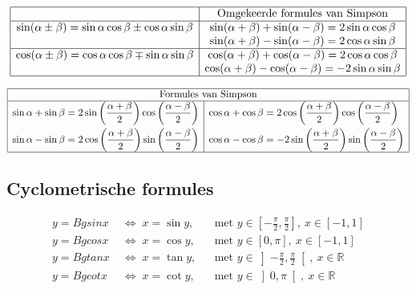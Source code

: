 \documentclass[a5paper]{article}
\begin{document}
\[
\begin{array}{|c|c|}
\hline
& \text{Omgekeerde formules van Simpson} \\ \hline

\sin(\alpha \pm \beta) = \sin\alpha\cos\beta \pm \cos\alpha\sin\beta &
\sin(\alpha + \beta) + \sin(\alpha - \beta) = 2\sin\alpha\cos\beta \\

& \sin(\alpha + \beta) - \sin(\alpha - \beta) = 2\cos\alpha\sin\beta \\ \hline

\cos(\alpha \pm \beta) = \cos\alpha\cos\beta \mp \sin\alpha\sin\beta &
\cos(\alpha + \beta) + \cos(\alpha - \beta) = 2\cos\alpha\cos\beta \\

& \cos(\alpha + \beta) - \cos(\alpha - \beta) = -2\sin\alpha\sin\beta \\ \hline

\end{array}
\]


\[
\begin{array}{|c|c|}
\hline
\multicolumn{2}{|c|}{\text{Formules van Simpson}} \\ \hline
\begin{aligned}
\sin \alpha + \sin \beta &= 2\sin\left(\frac{\alpha + \beta}{2}\right)\cos\left(\frac{\alpha - \beta}{2}\right) \\
\sin \alpha - \sin \beta &= 2\cos\left(\frac{\alpha + \beta}{2}\right)\sin\left(\frac{\alpha - \beta}{2}\right)
\end{aligned} & 
\begin{aligned}
\cos \alpha + \cos \beta &= 2\cos\left(\frac{\alpha + \beta}{2}\right)\cos\left(\frac{\alpha - \beta}{2}\right) \\
\cos \alpha - \cos \beta &= -2\sin\left(\frac{\alpha + \beta}{2}\right)\sin\left(\frac{\alpha - \beta}{2}\right)
\end{aligned} \\
\hline
\end{array}
\]
\newpage

\subsection{Cyclometrische formules}

\[
\begin{aligned}
y=Bgsin x &\;\Leftrightarrow\; x=\sin y,  && \text{met } y\in\left[-\tfrac{\pi}{2},\tfrac{\pi}{2}\right],\ x\in[-1,1]\\
y=Bgcos x &\;\Leftrightarrow\; x=\cos y,  && \text{met } y\in[0,\pi],\ x\in[-1,1]\\
y=Bgtan x &\;\Leftrightarrow\; x=\tan y,  && \text{met } y\in\left]-\tfrac{\pi}{2},\tfrac{\pi}{2}\right[,\ x\in\mathbb{R}\\
y=Bgcot x &\;\Leftrightarrow\; x=\cot y,  && \text{met } y\in\left]0,{\pi}\right[,\ x\in\mathbb{R}
\end{aligned}
\]
\end{document}
